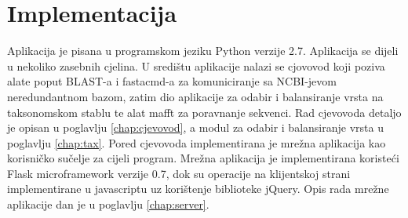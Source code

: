 \chapter{Implementacija}
\label{chap:implementacija}


Aplikacija je pisana u programskom jeziku Python verzije 2.7. Aplikacija se
dijeli u nekoliko zasebnih cjelina. U središtu aplikacije nalazi se cjovovod
koji poziva alate poput BLAST-a\cite{altschul1997gapped} i fastacmd-a za
komuniciranje sa NCBI-jevom neredundantnom bazom, zatim dio aplikacije za
odabir i balansiranje vrsta na taksonomskom stablu te alat mafft\cite{mafft} za
poravnanje sekvenci. Rad cjevovoda detaljo je opisan u poglavlju
\ref{chap:cjevovod}, a modul za odabir i balansiranje vrsta u poglavlju
\ref{chap:tax}. Pored cjevovoda implementirana je mrežna aplikacija kao
korisničko sučelje za cijeli program. Mrežna aplikacija je implementirana
koristeći Flask microframework verzije 0.7, dok su operacije na klijentskoj
strani implementirane u javascriptu uz korištenje biblioteke jQuery. Opis rada
mrežne aplikacije dan je u poglavlju \ref{chap:server}.



